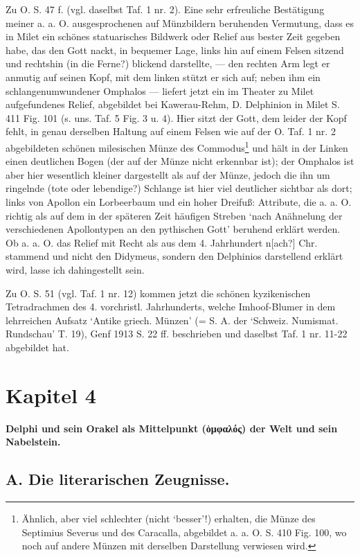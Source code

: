 \documentclass[a4paper, 11pt, oneside]{article}
\begin{document}
Zu O. S. 47 f. (vgl. daselbst Taf. 1 nr. 2). Eine sehr erfreuliche Bestätigung meiner a. a. O. ausgesprochenen auf Münzbildern beruhenden Vermutung, dass es in Milet ein schönes statuarisches Bildwerk oder Relief aus bester Zeit gegeben habe, das den Gott nackt, in bequemer Lage, links hin auf einem Felsen sitzend und rechtshin (in die Ferne?) blickend darstellte, --- den rechten Arm legt er anmutig auf seinen Kopf, mit dem linken stützt er sich auf; neben ihm ein schlangenumwundener Omphalos --- liefert jetzt ein im Theater zu Milet aufgefundenes Relief, abgebildet bei Kawerau-Rehm, D. Delphinion in Milet S. 411 Fig. 101 (s. uns. Taf. 5 Fig. 3 u. 4). Hier sitzt der Gott, dem leider der Kopf fehlt, in genau derselben Haltung auf einem Felsen wie auf der O. Taf. 1 nr. 2 abgebildeten schönen milesischen Münze des Commodus\footnote{Ähnlich, aber viel schlechter (nicht `besser'!) erhalten, die Münze des Septimius Severus und des Caracalla, abgebildet a. a. O. S. 410 Fig. 100, wo noch auf andere Münzen mit derselben Darstellung verwiesen wird.} und hält in der Linken einen deutlichen Bogen (der auf der Münze nicht erkennbar ist); der Omphalos ist aber hier wesentlich kleiner dargestellt als auf der Münze, jedoch die ihn um ringelnde (tote oder lebendige?) Schlange ist hier viel deutlicher sichtbar als dort; links von Apollon ein Lorbeerbaum und ein hoher Dreifuß: Attribute, die a. a. O. richtig als auf dem in der späteren Zeit häufigen Streben `nach Anähnelung der verschiedenen Apollontypen an den pythischen Gott' beruhend erklärt werden. Ob a. a. O. das Relief mit Recht als aus dem 4. Jahrhundert n[ach?] Chr. stammend und nicht den Didymeus, sondern den Delphinios darstellend erklärt wird, lasse ich dahingestellt sein.

Zu O. S. 51 (vgl. Taf. 1 nr. 12) kommen jetzt die schönen kyzikenischen Tetradrachmen des 4. vorchristl. Jahrhunderts, welche Imhoof-Blumer in dem lehrreichen Aufsatz `Antike griech. Münzen' (= S. A. der `Schweiz. Numismat. Rundschau' T. 19), Genf 1913 S. 22 ff. beschrieben und daselbst Taf. 1 nr. 11-22 abgebildet hat.
\clearpage
\section{Kapitel 4}
\begin{center}
\textbf{Delphi und sein Orakel als Mittelpunkt (ὀμφαλός) der Welt und sein Nabelstein.}
\end{center}
\subsection{A. Die literarischen Zeugnisse.}
\end{document}
